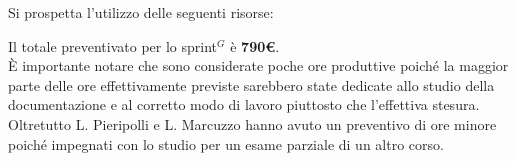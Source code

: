 Si prospetta l'utilizzo delle seguenti risorse:
\begin{table}[H]
	\centering
	\caption{Sprint 1: Preventivo}
\end{table}

Il totale preventivato per lo sprint$^G$ è \textbf{790€}.\\
È importante notare che sono considerate poche ore produttive poiché la maggior parte delle ore effettivamente previste sarebbero state dedicate allo studio della documentazione e al corretto modo di lavoro piuttosto che l'effettiva stesura.\\
Oltretutto L. Pieripolli e L. Marcuzzo hanno avuto un preventivo di ore minore poiché impegnati con lo studio per un esame parziale di un altro corso.

